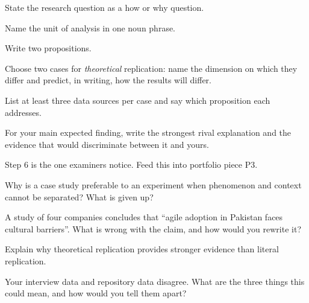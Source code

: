 \begin{lab}
\begin{tightnum}
  \item State the research question as a how or why question.
  \item Name the unit of analysis in one noun phrase.
  \item Write two propositions.
  \item Choose two cases for \emph{theoretical} replication: name the dimension
    on which they differ and predict, in writing, how the results will differ.
  \item List at least three data sources per case and say which proposition
    each addresses.
  \item For your main expected finding, write the strongest rival explanation
    and the evidence that would discriminate between it and yours.
\end{tightnum}

\medskip
Step 6 is the one examiners notice. Feed this into portfolio piece P3.
\end{lab}

\begin{checkpoint}
\begin{tightnum}
  \item Why is a case study preferable to an experiment when phenomenon and
    context cannot be separated? What is given up?
  \item A study of four companies concludes that ``agile adoption in Pakistan
    faces cultural barriers''. What is wrong with the claim, and how would you
    rewrite it?
  \item Explain why theoretical replication provides stronger evidence than
    literal replication.
  \item Your interview data and repository data disagree. What are the three
    things this could mean, and how would you tell them apart?
\end{tightnum}
\end{checkpoint}

